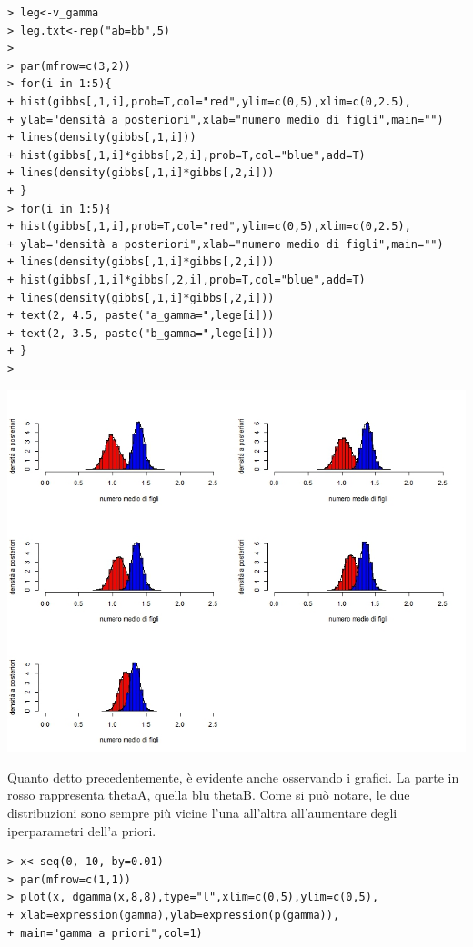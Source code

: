 \begin{enumerate}
\begin{verbatim}
> leg<-v_gamma
> leg.txt<-rep("ab=bb",5)
> 
> par(mfrow=c(3,2))
> for(i in 1:5){
+ hist(gibbs[,1,i],prob=T,col="red",ylim=c(0,5),xlim=c(0,2.5),
+ ylab="densità a posteriori",xlab="numero medio di figli",main="")
+ lines(density(gibbs[,1,i]))
+ hist(gibbs[,1,i]*gibbs[,2,i],prob=T,col="blue",add=T)
+ lines(density(gibbs[,1,i]*gibbs[,2,i]))
+ }
> for(i in 1:5){
+ hist(gibbs[,1,i],prob=T,col="red",ylim=c(0,5),xlim=c(0,2.5),
+ ylab="densità a posteriori",xlab="numero medio di figli",main="")
+ lines(density(gibbs[,1,i]*gibbs[,2,i]))
+ hist(gibbs[,1,i]*gibbs[,2,i],prob=T,col="blue",add=T)
+ lines(density(gibbs[,1,i]*gibbs[,2,i]))
+ text(2, 4.5, paste("a_gamma=",lege[i]))
+ text(2, 3.5, paste("b_gamma=",lege[i]))
+ }
> 
\end{verbatim} 

\begin{center}
\includegraphics[scale=0.5]{img/esercizio6-01-grafo1.jpeg}
\end{center}

Quanto detto precedentemente, è evidente anche osservando i grafici.
La parte in rosso rappresenta thetaA, quella blu thetaB.
Come si può notare, le due distribuzioni sono sempre più vicine l'una all'altra all'aumentare degli iperparametri dell'a priori.

\begin{verbatim}
> x<-seq(0, 10, by=0.01)
> par(mfrow=c(1,1))
> plot(x, dgamma(x,8,8),type="l",xlim=c(0,5),ylim=c(0,5),
+ xlab=expression(gamma),ylab=expression(p(gamma)),
+ main="gamma a priori",col=1)



\end{verbatim}
\end{enumerate}
